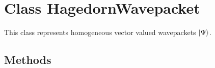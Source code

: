 
\section{Class HagedornWavepacket}

    \label{HagedornWavepacket:HagedornWavepacket}
This class represents homogeneous vector valued wavepackets
$\Ket{\Psi}$.



  \subsection{Methods}

    \label{HagedornWavepacket:HagedornWavepacket:__init__}

    \vspace{0.5ex}

